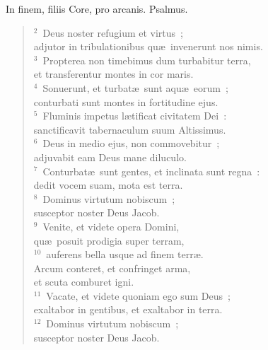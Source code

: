 \lettrine[lines=3,image=true,loversize=0.05,lraise=-0.03]{I}{}n finem, filiis Core, pro arcanis. Psalmus.
\begin{flushleft}\begin{verse}\vspace{6pt}${}^{2}$~Deus noster refugium et virtus~;\\ adjutor in tribulationibus qu\ae\ invenerunt nos nimis.\\
${}^{3}$~Propterea non timebimus dum turbabitur terra,\\ et transferentur montes in cor maris.\\
${}^{4}$~Sonuerunt, et turbat\ae\ sunt aqu\ae\ eorum~;\\ conturbati sunt montes in fortitudine ejus.\\
${}^{5}$~Fluminis impetus l\ae tificat civitatem Dei~:\\ sanctificavit tabernaculum suum Altissimus.\\
${}^{6}$~Deus in medio ejus, non commovebitur~;\\ adjuvabit eam Deus mane diluculo.\\
${}^{7}$~Conturbat\ae\ sunt gentes, et inclinata sunt regna~:\\ dedit vocem suam, mota est terra.\\
${}^{8}$~Dominus virtutum nobiscum~;\\ susceptor noster Deus Jacob.\\
${}^{9}$~Venite, et videte opera Domini,\\ qu\ae\ posuit prodigia super terram,\\
${}^{10}$~auferens bella usque ad finem terr\ae .\\ Arcum conteret, et confringet arma,\\ et scuta comburet igni.\\
${}^{11}$~Vacate, et videte quoniam ego sum Deus~;\\ exaltabor in gentibus, et exaltabor in terra.\\
${}^{12}$~Dominus virtutum nobiscum~;\\ susceptor noster Deus Jacob.\end{verse}\end{flushleft}



